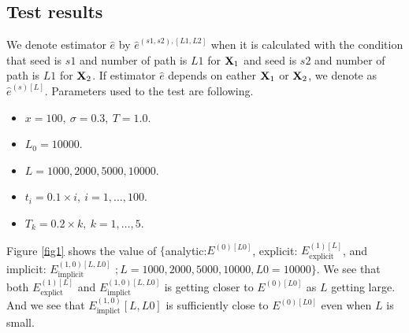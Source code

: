 \documentclass[12pt]{article}
\begin{document}
\subsection{Test results}
We denote estimator $\hat{e}$ by $\hat{e}^{(s1, s2),[L1, L2]}$ when it is 
calculated with the condition that seed is $s1$ and number of path is $L1$ for ${\bf X}_1$ and seed is $s2$ and number of path is  $L1$ for ${\bf X}_2$. 
If estimator $\hat{e}$ depends on eather ${\bf X}_1$ or ${\bf X}_2$, we denote as $\hat{e}^{(s)[L]}$.
Parameters used to the test are following.
\begin{itemize}
    \item $x = 100, \ \sigma = 0.3, \ T=1.0.$
    \item $L_0=10000.$ 
    \item $L=1000, 2000, 5000, 10000.$ 
    \item $t_i = 0.1 \times i, \ i = 1, \dots, 100.$
    \item $T_k = 0.2 \times k, \ k = 1, \dots, 5.$ 
\end{itemize}

Figure \ref{fig1} shows the value of $ \{$analytic:$E^{(0)[L0]}$, explicit: $E_{\text{explicit}}^{(1)[L]}$, and implicit: $E_{\text{implicit}}^{(1, 0)[L, L0]}$ $; L =1000, 2000, 5000, 10000,
L0 = 10000\}.$
We see that both 
$E_{\text{explict}}^{(1)[L]}$ and $E_{\text{implict}}^{(1, 0)[L, L0]}$ is getting 
closer to $E^{(0)[L0]}$ as $L$ getting large.
And we see that $E_{\text{implict}}^{(1, 0)}[L, L0]$ is sufficiently close to $E^{(0)[L0]}$ even 
when $L$ is small.
\end{document}
